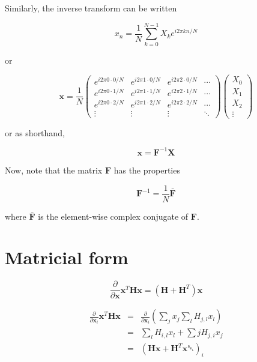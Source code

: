 \documentclass[12pt]{article}
\newcommand{\psf}{\mathbf{H}}
\newcommand{\x}{\mathbf{x}}
\newcommand{\ddx}{\frac{\partial}{\partial \mathbf{x}}}
\newcommand{\ddxi}{\frac{\partial}{\partial \mathbf{x}_{i}}}
\begin{document}
Similarly, the inverse transform can be written

\begin{equation}
x_n = \frac{1}{N} \sum_{k=0}^{N-1} X_k e^{i 2 \pi k n / N}
\end{equation}

or

\begin{equation}
   \mathbf{x} = \frac{1}{N} \left( \begin{array}{cccc}
   e^{i 2\pi 0 \cdot 0 / N} & e^{i 2\pi 1 \cdot 0 / N} & e^{i 2\pi 2 \cdot 0 / N} & \cdots \\
   e^{i 2\pi 0 \cdot 1 / N} & e^{i 2\pi 1 \cdot 1 / N} & e^{i 2\pi 2 \cdot 1 / N} & \cdots \\
   e^{i 2\pi 0 \cdot 2 / N} & e^{i 2\pi 1 \cdot 2 / N} & e^{i 2\pi 2 \cdot 2 / N} & \cdots \\
   \vdots & \vdots & \vdots & \ddots
   \end{array} \right)
   \left( \begin{array}{c} X_0 \\ X_1 \\ X_2 \\ \vdots \end{array} \right)
\end{equation}

or as shorthand,

\begin{equation}
\mathbf{x} = \mathbf{F}^{-1} \mathbf{X}
\end{equation}

Now, note that the matrix $\mathbf{F}$ has the properties

\begin{equation}
\mathbf{F}^{-1} = \frac{1}{N} \bar{\mathbf{F}}
\end{equation}

where $\bar{\mathbf{F}}$ is the element-wise complex
conjugate of $\mathbf{F}$.


\section{Matricial form}

\begin{equation}
  \label{eq:1}
  \ddx \x^{T}\psf\x = (\psf + \psf^{T}) \x
\end{equation}

\begin{eqnarray*}
  \label{eq:2}
  \ddxi \x^{T}\psf\x & = & \ddxi \left( \sum_{j} x_{j} \sum_{l} H_{j,l} x_{l}  \right) \\
                     & = & \sum_{l} H_{i,l} x_{l} + \sum{j} H_{j,i} x_{j} \\
                     & = & \left( \psf \x + \psf^{T} \x␇ \right)_{i}
\end{eqnarray*}
\end{document}
